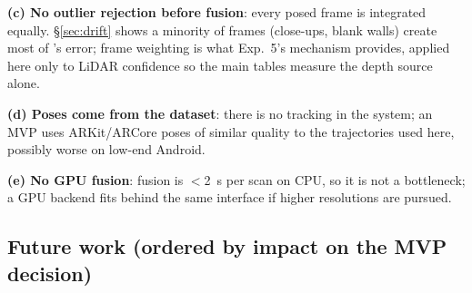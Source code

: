 \textbf{(c) No outlier rejection before fusion}: every posed frame is integrated equally. \S\ref{sec:drift} shows a
minority of frames (close-ups, blank walls) create most of 's error; frame weighting is what Exp.~5's
mechanism provides, applied here only to LiDAR confidence so the main tables measure the depth source alone.

\textbf{(d) Poses come from the dataset}: there is no tracking in the system; an MVP uses ARKit/ARCore poses of similar
quality to the trajectories used here, possibly worse on low-end Android.

\textbf{(e) No GPU fusion}: fusion is $<$\SI{2}{s} per scan on CPU, so it is not a bottleneck; a GPU backend fits behind
the same  interface if higher resolutions are pursued.

\subsection{Future work (ordered by impact on the MVP decision)}
